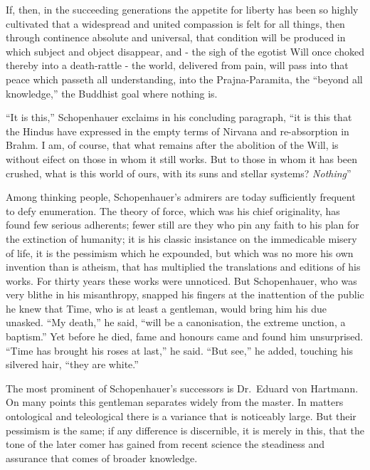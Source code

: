 \documentclass[]{book}
\begin{document}
If, then, in the succeeding generations the appetite for liberty has
been so highly cultivated that a widespread and united compassion is
felt for all things, then through continence absolute and universal,
that condition will be produced in which subject and object disappear,
and - the sigh of the egotist Will once choked thereby into a
death-rattle - the world, delivered from pain, will pass into that peace
which passeth all understanding, into the Prajna-Paramita, the ``beyond
all knowledge,'' the Buddhist goal where nothing is.

``It is this,'' Schopenhauer exclaims in his concluding paragraph, ``it
is this that the Hindus have expressed in the empty terms of Nirvana and
re-absorption in Brahm. I am, of course, that what remains after the
abolition of the Will, is without eifect on those in whom it still
works. But to those in whom it has been crushed, what is this world of
ours, with its suns and stellar systems? \emph{Nothing}''

Among thinking people, Schopenhauer's admirers are today sufficiently
frequent to defy enumeration. The theory of force, which was his chief
originality, has found few serious adherents; fewer still are they who
pin any faith to his plan for the extinction of humanity; it is his
classic insistance on the immedicable misery of life, it is the
pessimism which he expounded, but which was no more his own invention
than is atheism, that has multiplied the translations and editions of
his works. For thirty years these works were unnoticed. But
Schopenhauer, who was very blithe in his misanthropy, snapped his
fingers at the inattention of the public he knew that Time, who is at
least a gentleman, would bring him his due unasked. ``My death,'' he
said, ``will be a canonisation, the extreme unction, a baptism.'' Yet
before he died, fame and honours came and found him unsurprised. ``Time
has brought his roses at last,'' he said. ``But see,'' he added,
touching his silvered hair, ``they are white.''

The most prominent of Schopenhauer's successors is Dr.~Eduard von
Hartmann. On many points this gentleman separates widely from the
master. In matters ontological and teleological there is a variance that
is noticeably large. But their pessimism is the same; if any difference
is discernible, it is merely in this, that the tone of the later comer
has gained from recent science the steadiness and assurance that comes
of broader knowledge.
\end{document}
